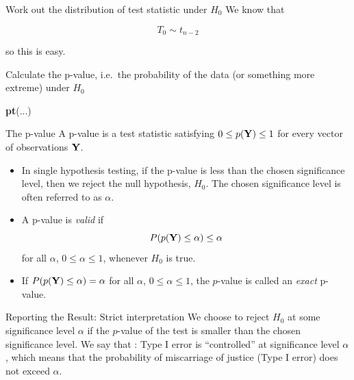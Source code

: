 \documentclass[
  ignorenonframetext,
]{beamer}
\newenvironment{Shaded}{\begin{snugshade}}{\end{snugshade}}
\newcommand{\FunctionTok}[1]{\textcolor[rgb]{0.13,0.29,0.53}{\textbf{#1}}}
\newcommand{\NormalTok}[1]{#1}
\begin{document}
\begin{frame}{Work out the distribution of test statistic under \(H_0\)}
\label{work-out-the-distribution-of-test-statistic-under-h_0}
We know that

\[
T_0\sim t_{n-2}
\]

so this is easy.
\end{frame}

\begin{frame}[fragile]{Calculate the p-value, i.e.~the probability of
the data (or something more extreme) under \(H_0\)}
\label{calculate-the-p-value-i.e.-the-probability-of-the-data-or-something-more-extreme-under-h_0}
\begin{Shaded}
\begin{Highlighting}[]
\FunctionTok{pt}\NormalTok{(...)}
\end{Highlighting}
\end{Shaded}
\end{frame}

\begin{frame}{The p-value}
\label{the-p-value}
A p-value is a test statistic satisfying \(0 \leq p({\bf Y}) \leq 1\)
for every vector of observations \({\bf Y}\).

\begin{itemize}
\item
  In single hypothesis testing, if the p-value is less than the chosen
  significance level, then we reject the null hypothesis, \(H_0\). The
  chosen significance level is often referred to as \(\alpha\).
\item
  A p-value is \emph{valid} if
  \[ P(p({\bf Y}) \leq \alpha) \leq \alpha\] for all \(\alpha\),
  \(0 \leq \alpha \leq 1\), whenever \(H_0\) is true.
\item
  If \(P(p({\bf Y}) \leq \alpha) = \alpha\) for all \(\alpha\),
  \(0 \leq \alpha \leq 1\), the \(p\)-value is called an \emph{exact}
  p-value.
\end{itemize}
\end{frame}

\begin{frame}{Reporting the Result: Strict interpretation}
\label{reporting-the-result-strict-interpretation}
We choose to reject \(H_0\) at some significance level \(\alpha\) if the
\(p\)-value of the test is smaller than the chosen significance level.
We say that : Type I error is ``controlled'' at significance level
\(\alpha\), which means that the probability of miscarriage of justice
(Type I error) does not exceed \(\alpha\).
\end{frame}
\end{document}
